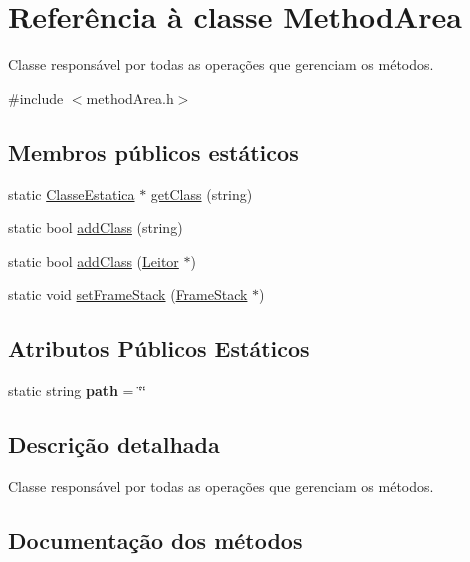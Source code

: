 \hypertarget{classMethodArea}{}\section{Referência à classe Method\+Area}
\label{classMethodArea}


Classe responsável por todas as operações que gerenciam os métodos.  




{\ttfamily \#include $<$method\+Area.\+h$>$}

\subsection*{Membros públicos estáticos}
\begin{DoxyCompactItemize}
\item 
static \hyperlink{classClasseEstatica}{Classe\+Estatica} $\ast$ \hyperlink{classMethodArea_a81670949394fd7400fe8c006d010385e}{get\+Class} (string)
\item 
static bool \hyperlink{classMethodArea_ab67aa1b648a2dd5d78acb925501c311e}{add\+Class} (string)
\item 
static bool \hyperlink{classMethodArea_a8f781122a775565f9d99ec5603e4f432}{add\+Class} (\hyperlink{classLeitor}{Leitor} $\ast$)
\item 
static void \hyperlink{classMethodArea_af072c9b681a57a35a713b86fa61984d2}{set\+Frame\+Stack} (\hyperlink{classFrameStack}{Frame\+Stack} $\ast$)
\end{DoxyCompactItemize}
\subsection*{Atributos Públicos Estáticos}
\begin{DoxyCompactItemize}
\item 
\mbox{\label{classMethodArea_a5fba57684c1552a65932306870b1130c}} 
static string {\bfseries path} = \char`\"{}\char`\"{}
\end{DoxyCompactItemize}


\subsection{Descrição detalhada}
Classe responsável por todas as operações que gerenciam os métodos. 

\subsection{Documentação dos métodos}
\mbox{\label{classMethodArea_ab67aa1b648a2dd5d78acb925501c311e}} 
